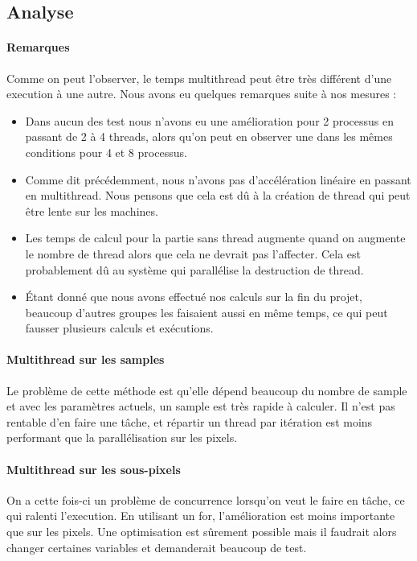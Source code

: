 \documentclass{article}
\begin{document}
\subsection{Analyse}

\paragraph{Remarques}
Comme on peut l'observer, le temps multithread peut \^etre tr\`es diff\'erent d'une execution \`a une autre. 
Nous avons eu quelques remarques suite \`a nos mesures : 
\begin{itemize}
    \item Dans aucun des test nous n'avons eu une am\'elioration pour 2 processus en passant de 2 \`a 4 threads, alors qu'on peut en observer une dans les m\^emes conditions pour 4 et 8 processus.
    \item Comme dit pr\'ec\'edemment, nous n'avons pas d'acc\'el\'eration lin\'eaire en passant en multithread. Nous pensons que cela est d\^u \`a la cr\'eation de thread qui peut \^etre lente sur les machines.
    \item Les temps de calcul pour la partie sans thread augmente quand on augmente le nombre de thread alors que cela ne devrait pas l'affecter. Cela est probablement d\^u au syst\`eme qui parall\'elise la destruction de thread.
    \item \'Etant donn\'e que nous avons effectu\'e nos calculs sur la fin du projet, beaucoup d'autres groupes les faisaient aussi en même temps, ce qui peut fausser plusieurs calculs et ex\'ecutions.
\end{itemize}

\paragraph{Multithread sur les samples}
Le probl\`eme de cette m\'ethode est qu'elle d\'epend beaucoup du nombre de sample et avec les param\`etres actuels, un sample est tr\`es rapide \`a calculer. 
Il n'est pas rentable d'en faire une t\^ache, et r\'epartir un thread par it\'eration est moins performant que la parall\'elisation sur les pixels.

\paragraph{Multithread sur les sous-pixels}
On a cette fois-ci un probl\`eme de concurrence lorsqu'on veut le faire en t\^ache, ce qui ralenti l'execution. En utilisant un for, l'am\'elioration est moins importante que sur les pixels.
Une optimisation est s\^urement possible mais il faudrait alors changer certaines variables et demanderait beaucoup de test.
\end{document}
